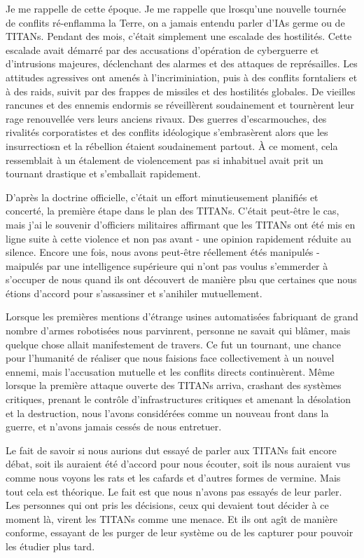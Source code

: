 Je me rappelle de cette époque. Je me rappelle que lrosqu'une nouvelle tournée de conflits ré-enflamma la Terre, on a jamais entendu parler d'IAs germe ou de TITANs. Pendant des mois, c'était simplement une escalade des hostilités. Cette escalade avait démarré par des accusations d'opération de cyberguerre et d'intrusions majeures, déclenchant des alarmes et des attaques de représailles. Les attitudes agressives ont amenés à l'incriminiation, puis à des conflits forntaliers et à des raids, suivit par des frappes de missiles et des hostilités globales. De vieilles rancunes et des ennemis endormis se réveillèrent soudainement et tournèrent leur rage renouvellée vers leurs anciens rivaux. Des guerres d'escarmouches, des rivalités corporatistes et des conflits idéologique s'embrasèrent alors que les insurrectiosn et la rébellion étaient soudainement partout. À ce moment, cela ressemblait à un étalement de violencement pas si inhabituel avait prit un tournant drastique et s'emballait rapidement. 

D'après la doctrine officielle, c'était un effort minutieusement planifiés et concerté, la première étape dans le plan des TITANs. C'était peut-être le cas, mais j'ai le souvenir d'officiers militaires affirmant que les TITANs ont été mis en ligne suite à cette violence et non pas avant - une opinion rapidement réduite au silence. Encore une fois, nous avons peut-être réellement étés manipulés - maipulés par une intelligence supérieure qui n'ont pas voulus s'emmerder à s'occuper de nous quand ils ont découvert de manière plsu que certaines que nous étions d'accord pour s'assassiner et s'anihiler mutuellement. 

Lorsque les premières mentions d'étrange usines automatisées fabriquant de grand nombre d'armes robotisées nous parvinrent, personne ne savait qui blâmer, mais quelque chose allait manifestement de travers. Ce fut un tournant, une chance pour l'humanité de réaliser que nous faisions face collectivement à un nouvel ennemi, mais l'accusation mutuelle et les conflits directs continuèrent. Même lorsque la première attaque ouverte des TITANs arriva, crashant des systèmes critiques, prenant le contrôle d'infrastructures critiques et amenant la désolation et la destruction, nous l'avons considérées comme un nouveau front dans la guerre, et n'avons jamais cessés de nous entretuer. 

Le fait de savoir si nous aurions dut essayé de parler aux TITANs fait encore débat, soit ils auraient été d'accord pour nous écouter, soit ils nous auraient vus comme nous voyons les rats et les cafards et d'autres formes de vermine. Mais tout cela est théorique. Le fait est que nous n'avons pas essayés de leur parler. Les personnes qui ont pris les décisions, ceux qui devaient tout décider à ce moment là, virent les TITANs comme une menace. Et ils ont agît de manière conforme, essayant de les purger de leur système ou de les capturer pour pouvoir les étudier plus tard. 

